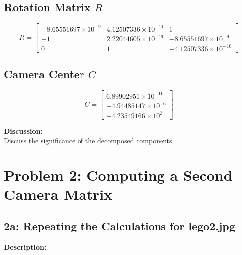 \documentclass{article}
\begin{document}
\subsection*{Rotation Matrix \(R\)}
\[
R = \begin{bmatrix}
-8.65551697 \times 10^{-9} & 4.12507336 \times 10^{-10} & 1 \\
-1 & 2.22044605 \times 10^{-16} & -8.65551697 \times 10^{-9} \\
0 & 1 & -4.12507336 \times 10^{-10}
\end{bmatrix}
\]

\subsection*{Camera Center \(C\)}
\[
C = \begin{bmatrix}
6.89902951 \times 10^{-11} \\
-4.94485147 \times 10^{-6} \\
-4.23549166 \times 10^{2}
\end{bmatrix}
\]

\textbf{Discussion:} \\
Discuss the significance of the decomposed components.

\section{Problem 2: Computing a Second Camera Matrix}

\subsection{2a: Repeating the Calculations for lego2.jpg}
\textbf{Description:} \\
\end{document}
